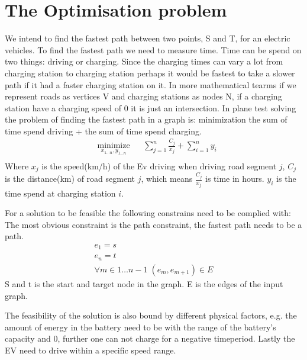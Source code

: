 \section{The Optimisation problem}

We intend to find the fastest path between two points, S and T, for an electric vehicles. To find the fastest path we need to measure time. Time can be spend on two things: driving or charging. Since the charging times can vary a lot from charging station to charging station perhaps it would be fastest to take a slower path if it had a faster charging station on it. In more mathematical tearms if we represent roads as vertices V and charging stations as nodes N, if a charging station have a charging speed of 0 it is just an intersection. In plane test solving the problem of finding the fastest path in a graph is: 
minimization the sum of time spend driving + the sum of time spend charging. 
\begin{equation}
\begin{aligned}
& \underset{x_{1 \dots n},y_{1 \dots n}}{\text{minimize}}
& & \sum_{j=1}^{n} \frac{C_j}{x_j} + \sum_{i=1}^{n} y_i \\
\end{aligned}
\end{equation}\label{eq:objfunction}
Where $x_j$ is the speed(km/h) of the Ev driving when driving road segment $j$, $C_j$ is the distance(km) of road segment $j$, which means $\frac{C_j}{x_j}$ is time in hours. $y_i$ is the time spend at charging station $i$.  

For a solution to be feasible the following constrains need to be complied with: 
The most obvious constraint is the path constraint, the fastest path needs to be a path. 
\begin{gather}
e_1 = s \\
e_n = t \\
\forall{m \in 1 \dots n-1} \; (e_m, e_{m+1}) \in E 
\end{gather}\label{eq:pathconstration} 
S and  t is the start and target node in the graph. E is the edges of the input graph.  

The feasibility of the solution is also bound by different physical factors, e.g. the amount of energy in the battery need to be with the range of the battery's capacity and 0, further one can not charge for a negative timeperiod. Lastly the EV need to drive within a specific speed range.     

